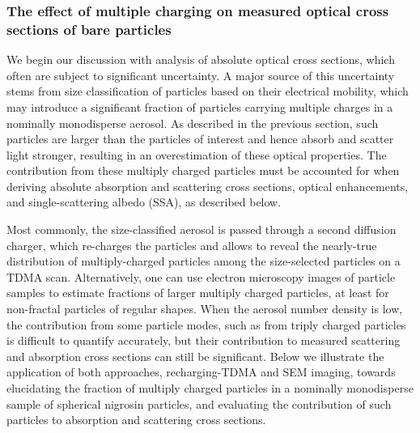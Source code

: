 \subsubsection{The effect of multiple charging on measured optical cross sections of bare particles}

We begin our discussion with analysis of absolute optical cross sections, which often are subject to significant uncertainty. A major source of this uncertainty stems from size classification of particles based on their electrical mobility, which may introduce a significant fraction of particles carrying multiple charges in a nominally monodisperse aerosol. As described in the previous section, such particles are larger than the particles of interest and hence absorb and scatter light stronger, resulting in an overestimation of these optical properties. The contribution from these multiply charged particles must be accounted for when deriving absolute absorption and scattering cross sections, optical enhancements, and single-scattering albedo (SSA), as described below.

Most commonly, the size-classified aerosol is passed through a second diffusion charger, which re-charges the particles and allows to reveal the nearly-true distribution of multiply-charged particles among the size-selected particles on a TDMA scan. Alternatively, one can use electron microscopy images of particle samples to estimate fractions of larger multiply charged particles, at least for non-fractal particles of regular shapes. When the aerosol number density is low, the contribution from some particle modes, such as from triply charged particles is difficult to quantify accurately, but their contribution to measured scattering and absorption cross sections can still be significant. Below we illustrate the application of both approaches, recharging-TDMA and SEM imaging, towards elucidating the fraction of multiply charged particles in a nominally monodisperse sample of spherical nigrosin particles, and evaluating the contribution of such particles to absorption and scattering cross sections.

